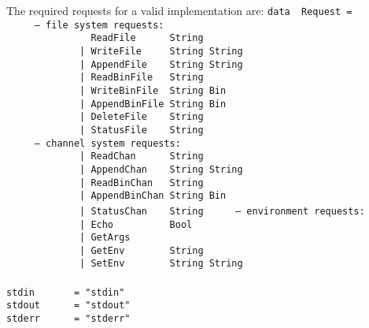 The required requests for a valid implementation are:
\bprog
\mbox{\tt data\ \ Request\ =\ }\\
\mbox{\tt \ \ \ \ \ --\ file\ system\ requests:}\\
\mbox{\tt \ \ \ \ \ \ \ \ \ \ \ \ \ \ \ ReadFile\ \ \ \ \ \ String\ \ \ \ \ \ \ \ \ }\\
\mbox{\tt \ \ \ \ \ \ \ \ \ \ \ \ \ |\ WriteFile\ \ \ \ \ String\ String}\\
\mbox{\tt \ \ \ \ \ \ \ \ \ \ \ \ \ |\ AppendFile\ \ \ \ String\ String}\\
\mbox{\tt \ \ \ \ \ \ \ \ \ \ \ \ \ |\ ReadBinFile\ \ \ String\ }\\
\mbox{\tt \ \ \ \ \ \ \ \ \ \ \ \ \ |\ WriteBinFile\ \ String\ Bin}\\
\mbox{\tt \ \ \ \ \ \ \ \ \ \ \ \ \ |\ AppendBinFile\ String\ Bin}\\
\mbox{\tt \ \ \ \ \ \ \ \ \ \ \ \ \ |\ DeleteFile\ \ \ \ String}\\
\mbox{\tt \ \ \ \ \ \ \ \ \ \ \ \ \ |\ StatusFile\ \ \ \ String}\\
\mbox{\tt \ \ \ \ \ --\ channel\ system\ requests:}\\
\mbox{\tt \ \ \ \ \ \ \ \ \ \ \ \ \ |\ ReadChan\ \ \ \ \ \ String\ }\\
\mbox{\tt \ \ \ \ \ \ \ \ \ \ \ \ \ |\ AppendChan\ \ \ \ String\ String}\\
\mbox{\tt \ \ \ \ \ \ \ \ \ \ \ \ \ |\ ReadBinChan\ \ \ String\ }\\
\mbox{\tt \ \ \ \ \ \ \ \ \ \ \ \ \ |\ AppendBinChan\ String\ Bin}\\
\mbox{\tt \ \ \ \ \ \ \ \ \ \ \ \ \ |\ StatusChan\ \ \ \ String}
\eprogNoSkip
\bprog
\mbox{\tt \ \ \ \ \ --\ environment\ requests:}\\
\mbox{\tt \ \ \ \ \ \ \ \ \ \ \ \ \ |\ Echo\ \ \ \ \ \ \ \ \ \ Bool}\\
\mbox{\tt \ \ \ \ \ \ \ \ \ \ \ \ \ |\ GetArgs}\\
\mbox{\tt \ \ \ \ \ \ \ \ \ \ \ \ \ |\ GetEnv\ \ \ \ \ \ \ \ String}\\
\mbox{\tt \ \ \ \ \ \ \ \ \ \ \ \ \ |\ SetEnv\ \ \ \ \ \ \ \ String\ String}\\
\mbox{\tt }\\[-8pt]
\mbox{\tt stdin\ \ \ \ \ \ \ =\ "stdin"}\\
\mbox{\tt stdout\ \ \ \ \ \ =\ "stdout"}\\
\mbox{\tt stderr\ \ \ \ \ \ =\ "stderr"}\\

